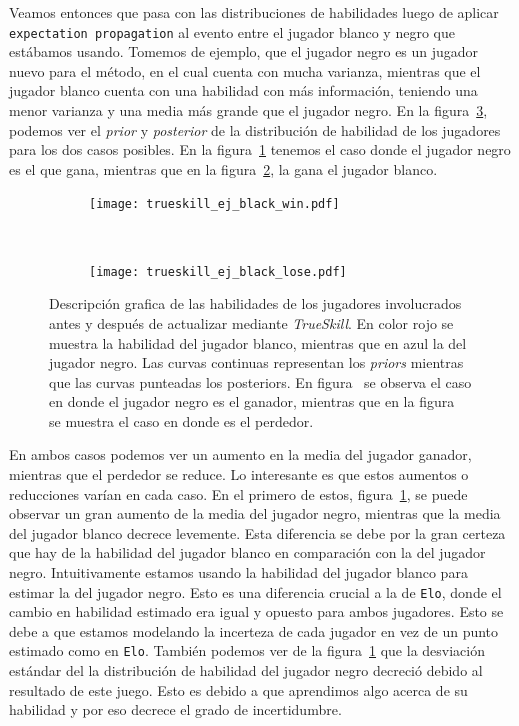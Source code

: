 \documentclass[11pt,twoside, spanish]{report} %
\begin{document}
Veamos entonces que pasa con las distribuciones de habilidades luego de aplicar \texttt{expectation propagation} al evento entre el jugador blanco y negro que est\'abamos usando.
Tomemos de ejemplo, que el jugador negro es un jugador nuevo para el m\'etodo, en el cual cuenta con mucha varianza, mientras que el jugador blanco cuenta con una habilidad con m\'as informaci\'on, teniendo una menor varianza y una media m\'as grande que el jugador negro.
En la figura~\ref{fig:ejTrue}, podemos ver el \textit{prior} y \textit{posterior} de la distribuci\'on de habilidad de los jugadores para los dos casos posibles.
En la figura~\ref{fig:ejTrueWin} tenemos el caso donde el jugador negro es el que gana, mientras que en la figura~\ref{fig:ejTrueLose}, la gana el jugador blanco.

\begin{figure}[H]
	\centering
	\begin{subfigure}[t]{.49\textwidth}
		\centering
	\texttt{[image: trueskill\_ej\_black\_win.pdf]}
	\caption{}
	\label{fig:ejTrueWin}
	\end{subfigure}
 	~
	\begin{subfigure}[t]{.49\textwidth}
		\centering
	\texttt{[image: trueskill\_ej\_black\_lose.pdf]}
	\caption{}
	\label{fig:ejTrueLose}
\end{subfigure}
	\caption{Descripci\'on grafica de las habilidades de los jugadores involucrados antes y despu\'es de actualizar mediante \textit{TrueSkill}. En color rojo se muestra la habilidad del jugador blanco, mientras que en azul la del jugador negro. Las curvas continuas representan los \textit{priors} mientras que las curvas punteadas los posteriors. En figura~ se observa el caso en donde el jugador negro es el ganador, mientras que en la figura~ se muestra el caso en donde es el perdedor.}
\label{fig:ejTrue}
\end{figure}

En ambos casos podemos ver  un aumento en la media del jugador ganador, mientras que el perdedor se reduce.
Lo interesante es que estos aumentos o reducciones var\'ian en cada caso.
En el primero de estos, figura~\ref{fig:ejTrueWin}, se puede observar un gran aumento de la media del jugador negro, mientras que la media del jugador blanco decrece levemente.
Esta diferencia se debe por la gran certeza que hay de la habilidad del jugador blanco en comparaci\'on con la del jugador negro.
Intuitivamente estamos usando la habilidad del jugador blanco para estimar la del jugador negro.
Esto es una diferencia crucial a la de \texttt{Elo}, donde el cambio en habilidad estimado era igual y opuesto para ambos jugadores.
Esto se debe a que estamos modelando la incerteza de cada jugador en vez de un punto estimado como en \texttt{Elo}.
Tambi\'en podemos ver de la figura~\ref{fig:ejTrueWin} que la desviaci\'on est\'andar del la distribuci\'on de habilidad del jugador negro decreci\'o debido al resultado de este juego.
Esto es debido a que aprendimos algo acerca de su habilidad y por eso decrece el grado de incertidumbre.
\end{document}

